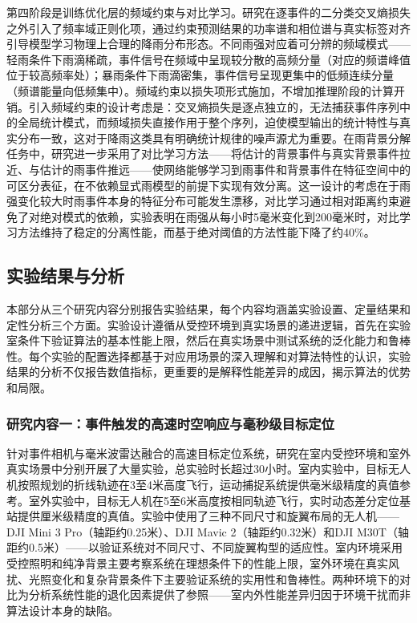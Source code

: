 第四阶段是训练优化层的频域约束与对比学习。研究在逐事件的二分类交叉熵损失之外引入了频率域正则化项，通过约束预测结果的功率谱和相位谱与真实标签对齐引导模型学习物理上合理的降雨分布形态。不同雨强对应着可分辨的频域模式——轻雨条件下雨滴稀疏，事件信号在频域中呈现较分散的高频分量（对应的频谱峰值位于较高频率处）；暴雨条件下雨滴密集，事件信号呈现更集中的低频连续分量（频谱能量向低频集中）。频域约束以损失项形式施加，不增加推理阶段的计算开销。引入频域约束的设计考虑是：交叉熵损失是逐点独立的，无法捕获事件序列中的全局统计模式，而频域损失直接作用于整个序列，迫使模型输出的统计特性与真实分布一致，这对于降雨这类具有明确统计规律的噪声源尤为重要。在雨背景分解任务中，研究进一步采用了对比学习方法——将估计的背景事件与真实背景事件拉近、与估计的雨事件推远——使网络能够学习到雨事件和背景事件在特征空间中的可区分表征，在不依赖显式雨模型的前提下实现有效分离。这一设计的考虑在于雨强变化较大时雨事件本身的特征分布可能发生漂移，对比学习通过相对距离约束避免了对绝对模式的依赖，实验表明在雨强从每小时5毫米变化到200毫米时，对比学习方法维持了稳定的分离性能，而基于绝对阈值的方法性能下降了约40\%。

\subsection{实验结果与分析}

本部分从三个研究内容分别报告实验结果，每个内容均涵盖实验设置、定量结果和定性分析三个方面。实验设计遵循从受控环境到真实场景的递进逻辑，首先在实验室条件下验证算法的基本性能上限，然后在真实场景中测试系统的泛化能力和鲁棒性。每个实验的配置选择都基于对应用场景的深入理解和对算法特性的认识，实验结果的分析不仅报告数值指标，更重要的是解释性能差异的成因，揭示算法的优势和局限。

\subsubsection{研究内容一：事件触发的高速时空响应与毫秒级目标定位}

针对事件相机与毫米波雷达融合的高速目标定位系统，研究在室内受控环境和室外真实场景中分别开展了大量实验，总实验时长超过30小时。室内实验中，目标无人机按照规划的折线轨迹在3至4米高度飞行，运动捕捉系统提供毫米级精度的真值参考。室外实验中，目标无人机在5至6米高度按相同轨迹飞行，实时动态差分定位基站提供厘米级精度的真值。实验中使用了三种不同尺寸和旋翼布局的无人机——DJI Mini 3 Pro（轴距约0.25米）、DJI Mavic 2（轴距约0.32米）和DJI M30T（轴距约0.5米）——以验证系统对不同尺寸、不同旋翼构型的适应性。室内环境采用受控照明和纯净背景主要考察系统在理想条件下的性能上限，室外环境在真实风扰、光照变化和复杂背景条件下主要验证系统的实用性和鲁棒性。两种环境下的对比为分析系统性能的退化因素提供了参照——室内外性能差异归因于环境干扰而非算法设计本身的缺陷。

